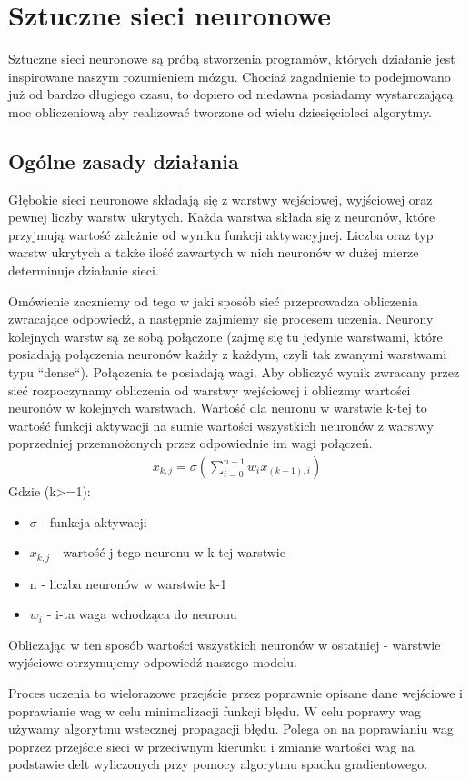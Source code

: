 \documentclass{article}
\begin{document}
\section{Sztuczne sieci neuronowe}
Sztuczne sieci neuronowe są próbą stworzenia programów, których działanie jest inspirowane naszym rozumieniem mózgu.
Chociaż zagadnienie to podejmowano już od bardzo długiego czasu, to dopiero od niedawna posiadamy wystarczającą moc obliczeniową aby realizować tworzone od wielu dziesięcioleci algorytmy.

\subsection{Ogólne zasady działania}
Głębokie sieci neuronowe składają się z warstwy wejściowej, wyjściowej oraz pewnej liczby warstw ukrytych.
Każda warstwa składa się z neuronów, które przyjmują wartość zależnie od wyniku funkcji aktywacyjnej.
Liczba oraz typ warstw ukrytych a także ilość zawartych w nich neuronów w dużej mierze determinuje działanie sieci.

Omówienie zaczniemy od tego w jaki sposób sieć przeprowadza obliczenia zwracające odpowiedź, a następnie zajmiemy się procesem uczenia.
Neurony kolejnych warstw są ze sobą połączone (zajmę się tu jedynie warstwami, które posiadają połączenia neuronów każdy z każdym, czyli tak zwanymi warstwami typu ``dense``).
Połączenia te posiadają wagi.
Aby obliczyć wynik zwracany przez sieć rozpoczynamy obliczenia od warstwy wejściowej i obliczmy wartości neuronów w kolejnych warstwach.
Wartość dla neuronu w warstwie k-tej to wartość funkcji aktywacji na sumie wartości wszystkich neuronów z warstwy poprzedniej przemnożonych przez odpowiednie im wagi połączeń.
\begin{align*}
  x_{k,j} = \sigma(\sum\limits_{i=0}^{n-1}{w_ix_{(k-1),i}})
\end{align*}
Gdzie (k>=1):
\begin{itemize}
  \item $\sigma$ - funkcja aktywacji
  \item $x_{k,j}$ - wartość j-tego neuronu w k-tej warstwie
  \item n - liczba neuronów w warstwie k-1
  \item $w_i$ - i-ta waga wchodząca do neuronu
\end{itemize}
Obliczając w ten sposób wartości wszystkich neuronów w ostatniej - warstwie wyjściowe otrzymujemy odpowiedź naszego modelu.

Proces uczenia to wielorazowe przejście przez poprawnie opisane dane wejściowe i poprawianie wag w celu minimalizacji funkcji błędu.
W celu poprawy wag używamy algorytmu wstecznej propagacji błędu.
Polega on na poprawianiu wag poprzez przejście sieci w przeciwnym kierunku i zmianie wartości wag na podstawie delt wyliczonych przy pomocy algorytmu spadku gradientowego.
\end{document}
